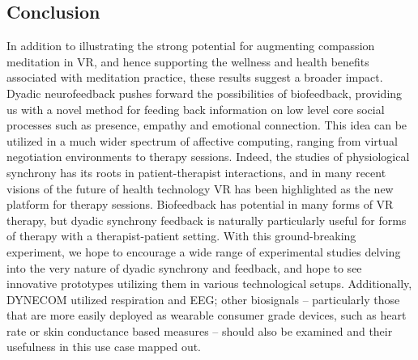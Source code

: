 \documentclass[manuscript, review = false, screen]{acmart}
\begin{document}
\subsection{Conclusion}
In addition to illustrating the strong potential for augmenting compassion meditation in VR, and hence supporting the wellness and health benefits associated with meditation practice, these results suggest a broader impact. Dyadic neurofeedback pushes forward the possibilities of biofeedback, providing us with a novel method for feeding back information on low level core social processes such as presence, empathy and emotional connection. This idea can be utilized in a much wider spectrum of affective computing, ranging from virtual negotiation environments to therapy sessions. Indeed, the studies of physiological synchrony has its roots in patient-therapist interactions, and in many recent visions of the future of health technology VR has been highlighted as the new platform for therapy sessions. Biofeedback has potential in many forms of VR therapy, but dyadic synchrony feedback is naturally particularly useful for forms of therapy with a therapist-patient setting. With this ground-breaking experiment, we hope to encourage a wide range of experimental studies delving into the very nature of dyadic synchrony and feedback, and hope to see innovative prototypes utilizing them in various technological setups. Additionally, DYNECOM utilized respiration and EEG; other biosignals -- particularly those that are more easily deployed as wearable consumer grade devices, such as heart rate or skin conductance based measures -- should also be examined and their usefulness in this use case mapped out. 




\end{document}
